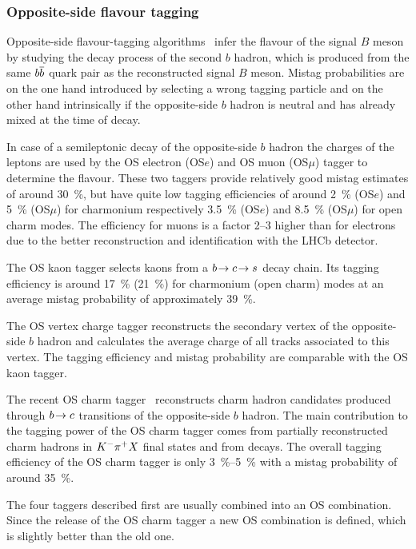 
\subsubsection{Opposite-side flavour tagging}
\label{sec:detector:software:tagging:ostagging}

Opposite-side flavour-tagging algorithms~\cite{LHCb-PAPER-2011-027} infer the
flavour of the signal $B$ meson by studying the decay process of the second
$b$ hadron, which is produced from the same ${{b}{\overline {{b}}}}$ quark pair as the
reconstructed signal $B$ meson. Mistag probabilities are on the one hand
introduced by selecting a wrong tagging particle and on the other hand
intrinsically if the opposite-side $b$ hadron is neutral and has already mixed
at the time of decay.

In case of a semileptonic decay of the opposite-side $b$ hadron the charges of
the leptons are used by the OS electron (OS$e$) and OS muon (OS$\mu$) tagger
to determine the flavour. These two taggers provide relatively good mistag
estimates of around \SI{30}{\percent}, but have quite low tagging efficiencies
of around \SI{2}{\percent} (OS$e$) and \SI{5}{\percent} (OS$\mu$) for
charmonium respectively \SI{3.5}{\percent} (OS$e$) and \SI{8.5}{\percent}
(OS$\mu$) for open charm modes. The efficiency for muons is a factor
\numrange{2}{3} higher than for electrons due to the better reconstruction and
identification with the LHCb detector.

The OS kaon tagger selects kaons from a ${b}\!\rightarrow{\ensuremath{c}}\!\rightarrow{\ensuremath{s}}$
decay chain. Its tagging efficiency is around \SI{17}{\percent}
(\SI{21}{\percent}) for charmonium (open charm) modes at an average mistag
probability of approximately \SI{39}{\percent}.

The OS vertex charge tagger reconstructs the secondary vertex of the
opposite-side $b$ hadron and calculates the average charge of all tracks
associated to this vertex. The tagging efficiency and mistag probability are
comparable with the OS kaon tagger.

The recent OS charm tagger~\cite{LHCb-PAPER-2015-027} reconstructs charm
hadron candidates produced through ${b}\!\rightarrow{\ensuremath{c}}$ transitions of the
opposite-side $b$ hadron. The main contribution to the tagging power of the OS
charm tagger comes from partially reconstructed charm hadrons in ${{K}^-}{{\pi}^+} X$
final states and from \DzToKpi decays. The overall tagging efficiency of the
OS charm tagger is only \SIrange{3}{5}{\percent} with a mistag probability of
around \SI{35}{\percent}.

The four taggers described first are usually combined into an OS combination.
Since the release of the OS charm tagger a new OS combination is defined,
which is slightly better than the old one.